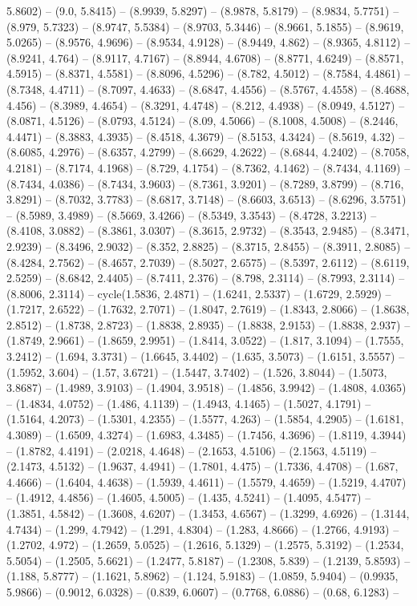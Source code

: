 5.8602) -- (9.0, 5.8415) -- (8.9939, 5.8297) -- (8.9878, 5.8179) -- (8.9834, 5.7751) -- (8.979, 5.7323) -- (8.9747, 5.5384) -- (8.9703, 5.3446) -- (8.9661, 5.1855) -- (8.9619, 5.0265) -- (8.9576, 4.9696) -- (8.9534, 4.9128) -- (8.9449, 4.862) -- (8.9365, 4.8112) -- (8.9241, 4.764) -- (8.9117, 4.7167) -- (8.8944, 4.6708) -- (8.8771, 4.6249) -- (8.8571, 4.5915) -- (8.8371, 4.5581) -- (8.8096, 4.5296) -- (8.782, 4.5012) -- (8.7584, 4.4861) -- (8.7348, 4.4711) -- (8.7097, 4.4633) -- (8.6847, 4.4556) -- (8.5767, 4.4558) -- (8.4688, 4.456) -- (8.3989, 4.4654) -- (8.3291, 4.4748) -- (8.212, 4.4938) -- (8.0949, 4.5127) -- (8.0871, 4.5126) -- (8.0793, 4.5124) -- (8.09, 4.5066) -- (8.1008, 4.5008) -- (8.2446, 4.4471) -- (8.3883, 4.3935) -- (8.4518, 4.3679) -- (8.5153, 4.3424) -- (8.5619, 4.32) -- (8.6085, 4.2976) -- (8.6357, 4.2799) -- (8.6629, 4.2622) -- (8.6844, 4.2402) -- (8.7058, 4.2181) -- (8.7174, 4.1968) -- (8.729, 4.1754) -- (8.7362, 4.1462) -- (8.7434, 4.1169) -- (8.7434, 4.0386) -- (8.7434, 3.9603) -- (8.7361, 3.9201) -- (8.7289, 3.8799) -- (8.716, 3.8291) -- (8.7032, 3.7783) -- (8.6817, 3.7148) -- (8.6603, 3.6513) -- (8.6296, 3.5751) -- (8.5989, 3.4989) -- (8.5669, 3.4266) -- (8.5349, 3.3543) -- (8.4728, 3.2213) -- (8.4108, 3.0882) -- (8.3861, 3.0307) -- (8.3615, 2.9732) -- (8.3543, 2.9485) -- (8.3471, 2.9239) -- (8.3496, 2.9032) -- (8.352, 2.8825) -- (8.3715, 2.8455) -- (8.3911, 2.8085) -- (8.4284, 2.7562) -- (8.4657, 2.7039) -- (8.5027, 2.6575) -- (8.5397, 2.6112) -- (8.6119, 2.5259) -- (8.6842, 2.4405) -- (8.7411, 2.376) -- (8.798, 2.3114) -- (8.7993, 2.3114) -- (8.8006, 2.3114) -- cycle(1.5836, 2.4871) -- (1.6241, 2.5337) -- (1.6729, 2.5929) -- (1.7217, 2.6522) -- (1.7632, 2.7071) -- (1.8047, 2.7619) -- (1.8343, 2.8066) -- (1.8638, 2.8512) -- (1.8738, 2.8723) -- (1.8838, 2.8935) -- (1.8838, 2.9153) -- (1.8838, 2.937) -- (1.8749, 2.9661) -- (1.8659, 2.9951) -- (1.8414, 3.0522) -- (1.817, 3.1094) -- (1.7555, 3.2412) -- (1.694, 3.3731) -- (1.6645, 3.4402) -- (1.635, 3.5073) -- (1.6151, 3.5557) -- (1.5952, 3.604) -- (1.57, 3.6721) -- (1.5447, 3.7402) -- (1.526, 3.8044) -- (1.5073, 3.8687) -- (1.4989, 3.9103) -- (1.4904, 3.9518) -- (1.4856, 3.9942) -- (1.4808, 4.0365) -- (1.4834, 4.0752) -- (1.486, 4.1139) -- (1.4943, 4.1465) -- (1.5027, 4.1791) -- (1.5164, 4.2073) -- (1.5301, 4.2355) -- (1.5577, 4.263) -- (1.5854, 4.2905) -- (1.6181, 4.3089) -- (1.6509, 4.3274) -- (1.6983, 4.3485) -- (1.7456, 4.3696) -- (1.8119, 4.3944) -- (1.8782, 4.4191) -- (2.0218, 4.4648) -- (2.1653, 4.5106) -- (2.1563, 4.5119) -- (2.1473, 4.5132) -- (1.9637, 4.4941) -- (1.7801, 4.475) -- (1.7336, 4.4708) -- (1.687, 4.4666) -- (1.6404, 4.4638) -- (1.5939, 4.4611) -- (1.5579, 4.4659) -- (1.5219, 4.4707) -- (1.4912, 4.4856) -- (1.4605, 4.5005) -- (1.435, 4.5241) -- (1.4095, 4.5477) -- (1.3851, 4.5842) -- (1.3608, 4.6207) -- (1.3453, 4.6567) -- (1.3299, 4.6926) -- (1.3144, 4.7434) -- (1.299, 4.7942) -- (1.291, 4.8304) -- (1.283, 4.8666) -- (1.2766, 4.9193) -- (1.2702, 4.972) -- (1.2659, 5.0525) -- (1.2616, 5.1329) -- (1.2575, 5.3192) -- (1.2534, 5.5054) -- (1.2505, 5.6621) -- (1.2477, 5.8187) -- (1.2308, 5.839) -- (1.2139, 5.8593) -- (1.188, 5.8777) -- (1.1621, 5.8962) -- (1.124, 5.9183) -- (1.0859, 5.9404) -- (0.9935, 5.9866) -- (0.9012, 6.0328) -- (0.839, 6.0607) -- (0.7768, 6.0886) -- (0.68, 6.1283) -- 